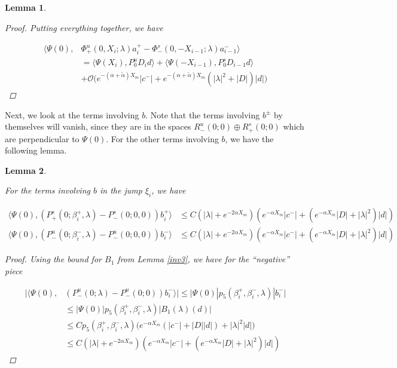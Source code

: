 \documentclass[12pt]{article}
\newtheorem{lemma}{Lemma}
\begin{document}
\begin{lemma}
\begin{proof}
Putting everything together, we have

\begin{align*}
\langle \Psi(0), &\Phi^u_+(0, X_i; \lambda)a_i^+ - \Phi^s_-(0, -X_{i-1}; \lambda)a_{i-1}^- \rangle \\
&= \langle \Psi(X_i), P^u_0 D_i d \rangle + \langle \Psi(-X_{i-1}), P^s_0 D_{i-1} d \rangle \\
&+ \mathcal{O}\Big( e^{-(\alpha + \tilde{\alpha})X_m} |c^-| 
+ e^{-(\alpha + \tilde{\alpha})X_m}(|\lambda|^2 + |D| )|d| \Big)
\end{align*}

\end{proof}
\end{lemma}

Next, we look at the terms involving $b$. Note that the terms involving $b^\pm$ by themselves will vanish, since they are in the spaces $R^u_-(0; 0) \oplus R^s_+(0; 0)$ which are perpendicular to $\Psi(0)$. For the other terms involving $b$, we have the following lemma.


\begin{lemma}\label{jumpb}

For the terms involving $b$ in the jump $\xi_i$, we have

\begin{align*}
\langle \Psi(0), (P^s_+(0; \beta_i^+, \lambda) - P^s_-(0; 0, 0))b_i^+ \rangle
&\leq C (|\lambda| + e^{-2 \alpha X_m})(e^{-\alpha X_m}|c^-| + (e^{-\alpha X_m}|D|+ |\lambda|^2 )|d|)  \\
\langle \Psi(0), (P^u_-(0; \beta_i^-, \lambda) - P^u_-(0; 0, 0))b_i^- \rangle
&\leq C (|\lambda| + e^{-2 \alpha X_m})(e^{-\alpha X_m}|c^-| + (e^{-\alpha X_m}|D|+ |\lambda|^2 )|d|)
\end{align*}

\begin{proof}

Using the bound for $B_1$ from Lemma \ref{inv3}, we have for the ``negative'' piece

\begin{align*}
|\langle \Psi(0), &(P^u_-(0; \lambda) - P^u_-(0; 0))b_i^- \rangle|
\leq |\Psi(0)| p_5(\beta_i^+, \beta_i^-, \lambda)|b_i^-| \\
&\leq |\Psi(0)| p_5(\beta_i^+, \beta_i^-, \lambda)|B_1(\lambda)(d)| \\
&\leq C p_5(\beta_i^+, \beta_i^-, \lambda)  \Big( 
e^{-\alpha X_m}( |c^-| + |D||d|) + |\lambda|^2 |d| \Big) \\
&\leq C (|\lambda| + e^{-2 \alpha X_m})(e^{-\alpha X_m}|c^-| + (e^{-\alpha X_m}|D|+ |\lambda|^2 )|d|)
\end{align*}

\end{proof}
\end{lemma}
\end{document}
